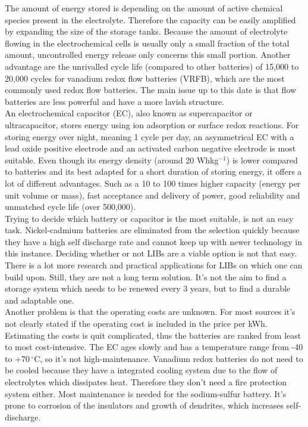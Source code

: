 \begin{parcolumns}[colwidths={1=2.5 cm, 2=10 cm, 3=2.5cm}]{3}
{The amount of energy stored is depending on the amount of active chemical species present in the electrolyte. Therefore the capacity can be easily amplified by expanding the size of the storage tanks. Because the amount of electrolyte flowing in the electrochemical cells is usually only a small fraction of the total amount, uncontrolled energy release only concerns this small portion. Another advantage are the unrivalled cycle life (compared to other batteries) of 15,000 to 20,000 cycles for vanadium redox flow batteries (VRFB), which are the most commonly used redox flow batteries. 
The main issue up to this date is that flow batteries are less powerful and have a more lavish structure. \\
An electrochemical capacitor (EC), also known as supercapacitor or ultracapacitor, stores energy using ion adsorption or surface redox reactions. For storing energy over night, meaning 1 cycle per day, an asymmetrical EC with a lead oxide positive electrode and an activated carbon negative electrode is most suitable. Even though its energy density (around 20 Whkg$^{-1}$) is lower compared to batteries and its best adapted for a short duration of storing energy, it offers a lot of different advantages. Such as a 10 to 100 times higher capacity (energy per unit volume or mass), fast acceptance and delivery of power, good reliability and unmatched cycle life (over 500,000).  \\
Trying to decide which battery or capacitor is the most suitable, is not an easy task. Nickel-cadmium batteries are eliminated from the selection quickly because they have a high self discharge rate and cannot keep up with newer technology in this instance. Deciding whether or not LIBs are a viable option is not that easy. There is a lot more research and practical applications for LIBs on which one can build upon. Still, they are not a long term solution. It's not the aim to find a storage system which needs to be renewed every  3 years, but to find a durable and adaptable one. \\ Another problem is that the operating costs are unknown. For most sources it's not clearly stated if the operating cost is included in the price per kWh. Estimating the costs is quit complicated, thus the batteries are ranked from least to most cost-intensive. The EC ages slowly and has a temperature range from -40 to +70\,$^\circ$C, so it's not high-maintenance. Vanadium redox batteries do not need to be cooled because they have a integrated cooling system due to the flow of electrolytes which dissipates heat. Therefore they don't need a fire protection system either. Most maintenance is needed for the sodium-sulfur battery. It's prone to corrosion of the insulators and growth of dendrites, which increases self-discharge.\\  
}
\end{parcolumns}
